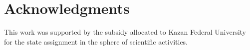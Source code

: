\section{Acknowledgments}\label{sec:acks}
This work was supported by the subsidy allocated to Kazan Federal University for the state assignment
in the sphere of scientific activities.
